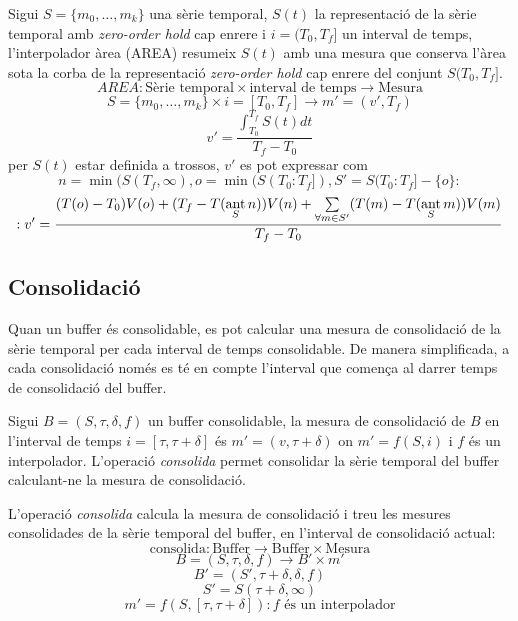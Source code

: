 \begin{definition}
  Sigui $S=\{m_0,\ldots,m_k\}$ una sèrie temporal, $S(t)$ la
  representació de la sèrie temporal amb \emph{zero-order hold} cap
  enrere i $i=(T_0,T_f]$ un interval de temps, l'interpolador àrea
  (AREA) resumeix $S(t)$ amb una mesura que conserva l'àrea sota la
  corba de la representació \emph{zero-order hold} cap enrere del
  conjunt $S(T_0,T_f]$.
\[
AREA: \text{Sèrie temporal} \times \text{interval de temps} \longrightarrow \text{Mesura}
\]
\[
S=\{m_0,\ldots,m_k\} \times i=[T_0,T_f]  \longrightarrow m'=(v',T_f)
\]
\[
v' = 
\frac{\int_{T_0}^{T_f} S(t) dt}{T_f - T_0}
\]
per $S(t)$ estar definida a trossos, $v'$ es pot expressar com
\[
n=\min(S(T_f,\infty),
o=\min(S(T_0:T_f]), 
S'= S(T_0:T_f] - \{o\}:
\]
\[
:v'= \frac{(T(o)-T_0)V(o) 
+( T_f- T(\operatorname*{ant}\limits_S n) )V(n) 
+\sum\limits_{\forall m \in S'}( T(m)- T(\operatorname*{ant}\limits_S m) )V(m)}
{T_f-T_0} 
\]
\end{definition}



\subsection{Consolidació}

Quan un buffer és consolidable, es pot calcular una mesura de consolidació de la sèrie temporal per cada interval de temps consolidable. De manera simplificada, a cada consolidació només es té en compte l'interval que comença al darrer temps de consolidació del buffer. 

Sigui $B=(S,\tau,\delta,f)$ un buffer consolidable, la mesura de consolidació de $B$ en l'interval de temps $i=[\tau,\tau+\delta]$ és $m'=(v,\tau+\delta)$ on $m'=f(S,i)$ i $f$ és un interpolador. L'operació \emph{consolida} permet consolidar la sèrie temporal del buffer calculant-ne la mesura de consolidació.

\begin{definition}
  L'operació \emph{consolida} calcula la mesura de consolidació i treu
  les mesures consolidades de la sèrie temporal del buffer, en
  l'interval de consolidació actual:
  \[
  \text{consolida}: \text{Buffer} \longrightarrow \text{Buffer} \times \text{Mesura}
  \]
  \[
  B=(S,\tau,\delta,f) \longrightarrow B' \times m'
  \]
  \[
  B'= (S',\tau+\delta,\delta,f)
  \]
  \[
  S' = S(\tau+\delta,\infty)
  \]
  \[
  m' = f(S,[\tau,\tau+\delta]): f \text{ és un interpolador}
  \]
\end{definition}



